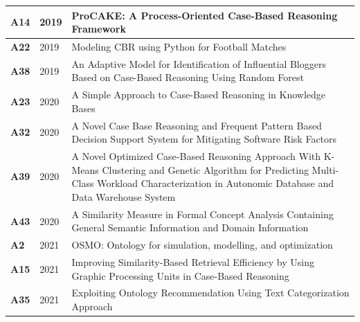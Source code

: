 {\begin{longtable}{ | m{1cm} | m{1.5cm} | m{12cm} | }
                    \hline
                    \textbf{A14} &2019 &ProCAKE: A Process-Oriented Case-Based Reasoning Framework \\ %
                    \hline
                    \textbf{A22} &2019 &Modeling CBR using Python for Football Matches \\ %
                    \hline
                    \textbf{A38} &2019 &An Adaptive Model for Identification of Influential Bloggers Based on Case-Based Reasoning Using Random Forest \\ %
                    \hline
                    \textbf{A23} &2020 &A Simple Approach to Case-Based Reasoning in Knowledge Bases \\ %
                    \hline
                    \textbf{A32} &2020 &A Novel Case Base Reasoning and Frequent Pattern Based Decision Support System for Mitigating Software Risk Factors \\ %
                    \hline
                    \textbf{A39} &2020 &A Novel Optimized Case-Based Reasoning Approach With K-Means Clustering and Genetic Algorithm for Predicting Multi-Class Workload Characterization in Autonomic Database and Data Warehouse System \\ %
                    \hline
                    \textbf{A43} &2020 &A Similarity Measure in Formal Concept Analysis Containing General Semantic Information and Domain Information \\ %
                    \hline
                    \textbf{A2} &2021 &OSMO: Ontology for simulation, modelling, and optimization \\ %
                    \hline
                    \textbf{A15} &2021 &Improving Similarity-Based Retrieval Efficiency by Using Graphic Processing Units in Case-Based Reasoning \\ %
                    \hline
                    \textbf{A35} &2021 &Exploiting Ontology Recommendation Using Text Categorization Approach \\ %

\end{longtable}}
